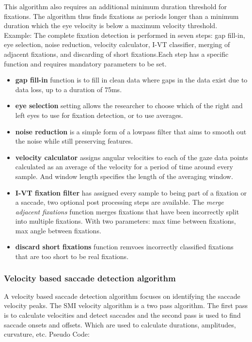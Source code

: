 \documentclass[12pt]{article}
\theoremstyle{definition}
\begin{document}
This algorithm also requires an additional minimum duration threshold for fixations. The algorithm thus finds fixations as periods longer than a minimum duration which the eye velocity is below a maximum velocity threshold.\\

Example: The complete fixation detection is performed in seven steps: gap fill-in, eye selection, noise reduction, velocity calculator, I-VT classifier, merging of adjacent fixations, and discarding of short fixations.Each step has a specific function and requires mandatory parameters to be set. 
\begin{itemize}
\item \textbf{gap fill-in} function is to fill in clean data where gaps in the data exist due to data loss, up to a duration of 75ms. 

\item \textbf{eye selection} setting allows the researcher to choose which of the right and left eyes to use for fixation detection, or to use averages. 

\item \textbf{noise reduction} is a simple form of a lowpass filter that aims to smooth out the noise while still preserving features.

\item \textbf{velocity calculator} assigns angular velocities to each of the gaze data points calculated as an average of the velocity for a period of time around every sample. And window length specifies the length of the averaging window.

\item \textbf{I-VT fixation filter} has assigned every sample to being part of a fixation or a saccade, two optional post processing steps are available. The \textit{merge adjacent fixations} function merges fixations that have been incorrectly split into multiple fixations. With two parameters: max time between fixations, max angle between fixations. 

\item \textbf{discard short fixations} function remvoes incorrectly classified fixations that are too short to be real fixations. 
\end{itemize}

\subsubsection{Velocity based saccade detection algorithm}
A velocity based saccade detection algorithm focuses on identifying the saccade velocity peaks. The SMI velocity algorithm is a two pass algorithm. The first pass is to calculate velocities and detect saccades and the second pass is used to find saccade onsets and offsets. Which are used to calculate durations, amplitudes, curvature, etc. Pseudo Code:
\end{document}
